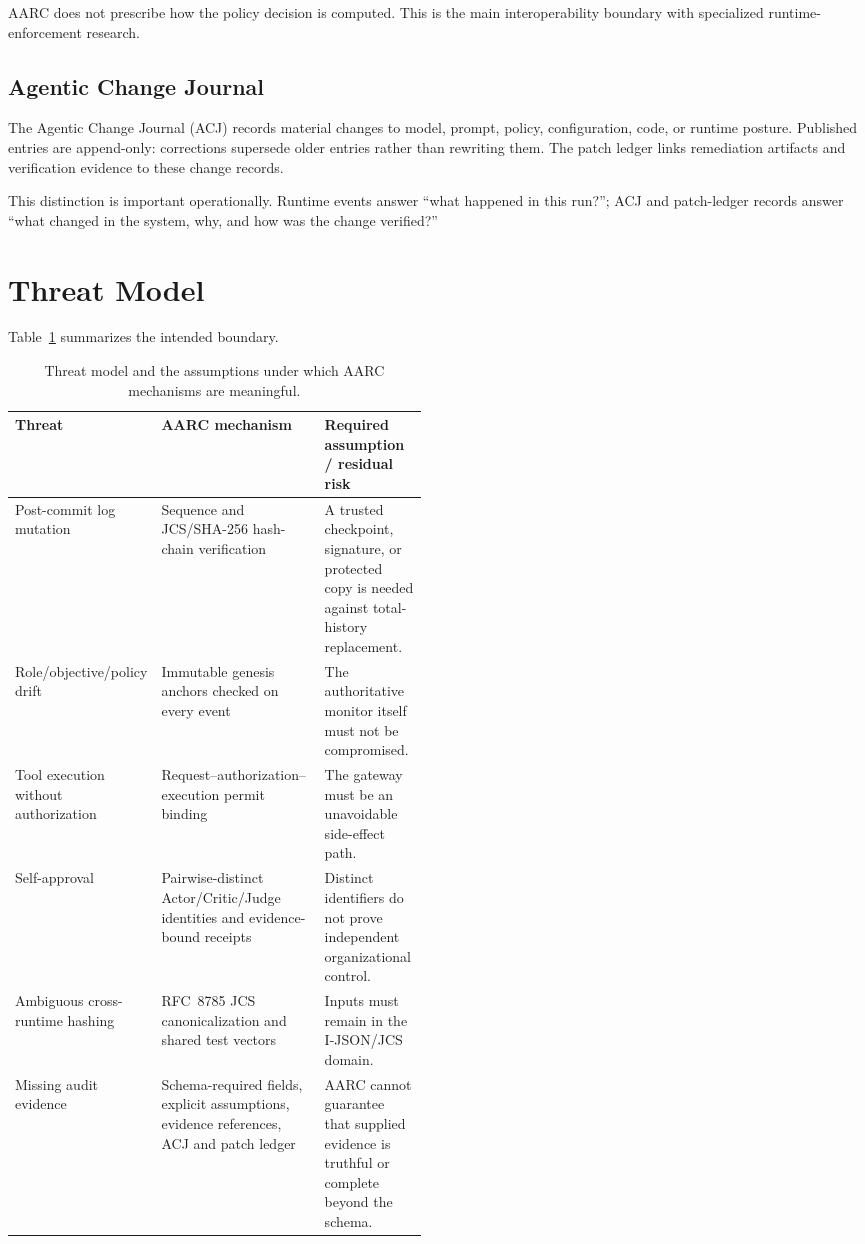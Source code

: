 \documentclass{article}
\begin{document}
AARC does not prescribe how the policy decision is computed. This is the main
interoperability boundary with specialized runtime-enforcement research.

\subsection{Agentic Change Journal}

The Agentic Change Journal (ACJ) records material changes to model, prompt,
policy, configuration, code, or runtime posture. Published entries are
append-only: corrections supersede older entries rather than rewriting them.
The patch ledger links remediation artifacts and verification evidence to these
change records.

This distinction is important operationally. Runtime events answer
“what happened in this run?”; ACJ and patch-ledger records answer
“what changed in the system, why, and how was the change verified?”

\section{Threat Model}

Table~\ref{tab:threats} summarizes the intended boundary.

\begin{table}[t]
\centering
\small
\begin{tabularx}{\linewidth}{p{0.23\linewidth} X p{0.25\linewidth}}
\toprule
Threat & AARC mechanism & Required assumption / residual risk \\
\midrule
Post-commit log mutation &
Sequence and JCS/SHA-256 hash-chain verification &
A trusted checkpoint, signature, or protected copy is needed against total-history replacement. \\
Role/objective/policy drift &
Immutable genesis anchors checked on every event &
The authoritative monitor itself must not be compromised. \\
Tool execution without authorization &
Request--authorization--execution permit binding &
The gateway must be an unavoidable side-effect path. \\
Self-approval &
Pairwise-distinct Actor/Critic/Judge identities and evidence-bound receipts &
Distinct identifiers do not prove independent organizational control. \\
Ambiguous cross-runtime hashing &
RFC~8785 JCS canonicalization and shared test vectors &
Inputs must remain in the I-JSON/JCS domain. \\
Missing audit evidence &
Schema-required fields, explicit assumptions, evidence references, ACJ and patch ledger &
AARC cannot guarantee that supplied evidence is truthful or complete beyond the schema. \\
\bottomrule
\end{tabularx}
\caption{Threat model and the assumptions under which AARC mechanisms are meaningful.}
\label{tab:threats}
\end{table}
\end{document}
